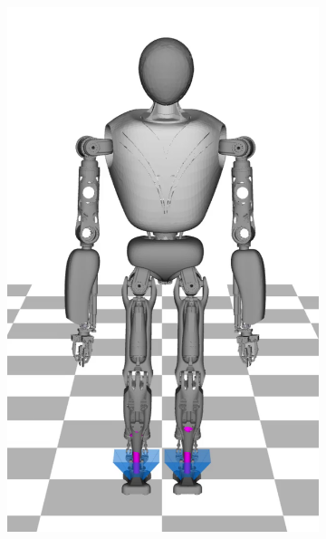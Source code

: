 \begin{figure}
\begin{subfigure}{.16\textwidth}
	\includegraphics[width=1\linewidth]{fig/walkStatic/snaps/1}
	\caption{}
\end{subfigure}%
\begin{subfigure}{.16\textwidth}

\end{subfigure}
\end{figure}
